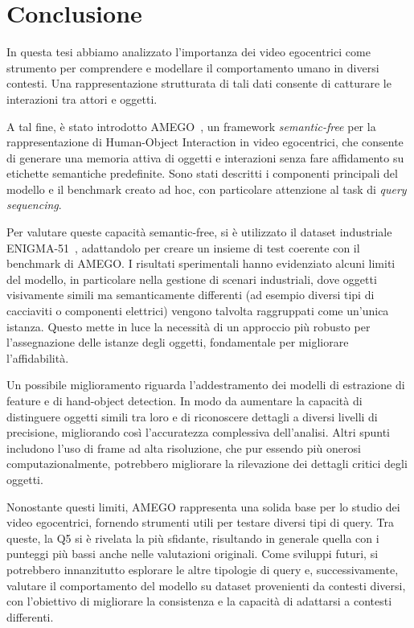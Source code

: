 \chapter*{Conclusione} %

In questa tesi abbiamo analizzato l'importanza dei video egocentrici come strumento per comprendere e modellare il comportamento umano in diversi contesti. Una rappresentazione strutturata di tali dati consente di catturare le interazioni tra attori e oggetti.

A tal fine, è stato introdotto AMEGO~\cite{goletto2024amego}, un framework \emph{semantic-free} per la rappresentazione di Human-Object Interaction in video egocentrici, che consente di generare una memoria attiva di oggetti e interazioni senza fare affidamento su etichette semantiche predefinite. Sono stati descritti i componenti principali del modello e il benchmark creato ad hoc, con particolare attenzione al task di \emph{query sequencing}.

Per valutare queste capacità semantic-free, si è utilizzato il dataset industriale ENIGMA-51~\cite{ragusa2023enigma51}, adattandolo per creare un insieme di test coerente con il benchmark di AMEGO. I risultati sperimentali hanno evidenziato alcuni limiti del modello, in particolare nella gestione di scenari industriali, dove oggetti visivamente simili ma semanticamente differenti (ad esempio diversi tipi di cacciaviti o componenti elettrici) vengono talvolta raggruppati come un'unica istanza. Questo mette in luce la necessità di un approccio più robusto per l'assegnazione delle istanze degli oggetti, fondamentale per migliorare l'affidabilità.

Un possibile miglioramento riguarda l'addestramento dei modelli di estrazione di feature e di hand-object detection. In modo da aumentare la capacità di distinguere oggetti simili tra loro e di riconoscere dettagli a diversi livelli di precisione, migliorando così l'accuratezza complessiva dell'analisi. Altri spunti includono l'uso di frame ad alta risoluzione, che pur essendo più onerosi computazionalmente, potrebbero migliorare la rilevazione dei dettagli critici degli oggetti.

Nonostante questi limiti, AMEGO rappresenta una solida base per lo studio dei video egocentrici, fornendo strumenti utili per testare diversi tipi di query. Tra queste, la Q5 si è rivelata la più sfidante, risultando in generale quella con i punteggi più bassi anche nelle valutazioni originali. Come sviluppi futuri, si potrebbero innanzitutto esplorare le altre tipologie di query e, successivamente, valutare il comportamento del modello su dataset provenienti da contesti diversi, con l'obiettivo di migliorare la consistenza e la capacità di adattarsi a contesti differenti.


